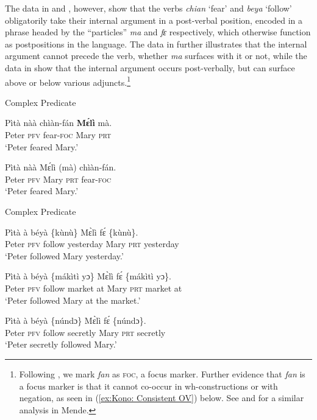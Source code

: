 \documentclass[output=paper,colorlinks,citecolor=brown,draftmode
]{langscibook}
\begin{document}
\z 

The data in  and , however, show that the verbs \textit{chian} ‘fear’ and \textit{beya} ‘follow’ obligatorily take their internal argument in a post-verbal position, encoded in a phrase headed by the “particles” \textit{ma} and \textit{fɛ} respectively, which otherwise function as postpositions in the language. The data in  further illustrates that the internal argument cannot precede the verb, whether \textit{ma} surfaces with it or not, while the data in  show that the internal argument occurs post-verbally, but can surface above or below various adjuncts.\footnote{Following \citet{kaiser2011grammar}, we mark \textit{fan} as \textsc{foc}, a focus marker. Further evidence that \textit{fan} is a focus marker is that it cannot co-occur in wh-constructions or with negation, as seen in (\ref{ex:Kono: Consistent OV}) below. See \citet{SmithDiss} and \citet{smith2024absence} for a similar analysis in Mende.}

\ea \label{ex:Kono:Complex Predicate fan}
Complex Predicate
\begin{xlist}

\ex \label{ex:Kono:chian x ma}
\gll Pìtà nàà	chìàn-fán	\textbf{Mɛ́lì} mà.  \\
Peter \textsc{pfv} fear-\textsc{foc} Mary \textsc{prt} \\
\glt `Peter feared Mary.' 

\ex \label{ex:Kono:*chian x ma}
\gll *Pìtà nàà	Mɛ́lì (mà) chìàn-fán. \\
Peter  \textsc{pfv} Mary \textsc{prt} fear-\textsc{foc}\\
\glt `Peter feared Mary.'

\end{xlist}
\z 

\newpage
\ea \label{ex:Kono:Complex Predicate beya}
Complex Predicate
\begin{xlist}

\ex \label{ex:Kono:beya temporal}
\gll Pìtà à béyà \{kùnù\} Mɛ̀lì fɛ́ \{kùnù\}. \\
Peter  \textsc{pfv} follow yesterday Mary \textsc{prt} yesterday\\
\glt `Peter followed Mary yesterday.'

\ex \label{ex:Kono:beya locative}
\gll Pìtà à béyà \{mákìtì yɔ\} Mɛ̀lì fɛ́ \{mákìtì yɔ\}. \\
Peter  \textsc{pfv} follow market at Mary \textsc{prt} market at\\
\glt `Peter followed Mary at the market.'

\ex \label{ex:Kono:beya adverb}
\gll Pìtà à béyà \{núndɔ\} Mɛ̀lì fɛ́ \{núndɔ\}. \\
Peter  \textsc{pfv} follow secretly Mary \textsc{prt} secretly\\
\glt `Peter secretly followed Mary.'

\end{xlist}
\z 
\end{document}
